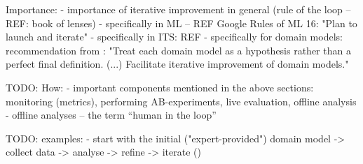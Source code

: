 Importance:
- importance of iterative improvement in general (rule of the loop -- REF: book of lenses)
- specifically in ML -- REF Google Rules of ML 16: "Plan to launch and iterate"
- specifically in ITS: REF
- specifically for domain models: recommendation from \cite[p.124]{its-domain-models}:
"Treat each domain model as a hypothesis rather than a perfect final definition. (...)
Facilitate iterative improvement of domain models."

TODO: How:
- important components mentioned in the above sections:
  monitoring (metrics), performing AB-experiments, live evaluation, offline
  analysis
- offline analyses -- the term ``human in the loop''
\cite{stupid-tutoring-systems-intelligent-humans}

TODO: examples:
- start with the initial ("expert-provided") domain model -> collect data ->
analyse -> refine -> iterate (\cite[chapter 10]{its-domain-models})

